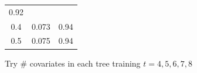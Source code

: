 \documentclass[]{article}
\begin{document}
\begin{longtable}[]{@{}ccc@{}}
\begin{minipage}[t]{0.13\columnwidth}
0.92\strut
\end{minipage}\tabularnewline
\begin{minipage}[t]{0.08\columnwidth}\centering\strut
0.4\strut
\end{minipage} & \begin{minipage}[t]{0.10\columnwidth}\centering\strut
0.073\strut
\end{minipage} & \begin{minipage}[t]{0.13\columnwidth}\centering\strut
0.94\strut
\end{minipage}\tabularnewline
\begin{minipage}[t]{0.08\columnwidth}\centering\strut
0.5\strut
\end{minipage} & \begin{minipage}[t]{0.10\columnwidth}\centering\strut
0.075\strut
\end{minipage} & \begin{minipage}[t]{0.13\columnwidth}\centering\strut
0.94\strut
\end{minipage}\tabularnewline
\bottomrule
\end{longtable}

Try \# covariates in each tree training \(t = 4, 5, 6, 7, 8\)
\end{document}
